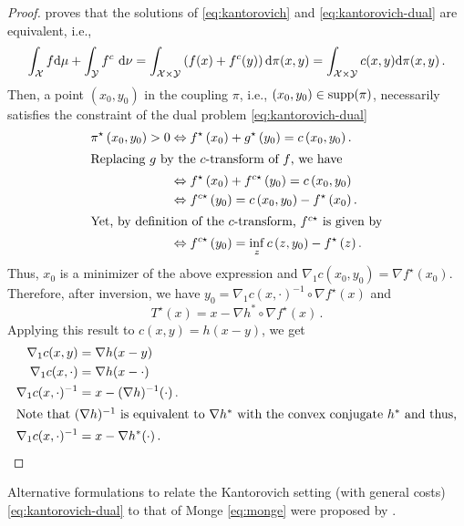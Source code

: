 \begin{proof}
\citet[Theorem 1.39]{santambrogio2015optimal} proves that the solutions of \eqref{eq:kantorovich} and \eqref{eq:kantorovich-dual} are equivalent, i.e.,
\begin{equation*}
	\int_{\mathcal{X}} f \mathrm{d} \mu+\int_{\mathcal{Y}} f^c \mathrm{~d} \nu=\int_{{\mathcal{X}} \times {\mathcal{Y}}}\left(f(x)+f^c(y)\right) \mathrm{d} \pi(x, y)=\int_{{\mathcal{X}} \times {\mathcal{Y}}} c(x, y) \mathrm{d} \pi(x, y)\,.
\end{equation*}
Then, a point $(x_0, y_0)$ in the coupling $\pi$, i.e., $(x_0, y_0) \in \operatorname{supp}(\pi)$, necessarily satisfies the constraint of the dual problem \eqref{eq:kantorovich-dual}
\begin{align*}
\pi^{\star}\left(x_0, y_0\right)>0 & \Leftrightarrow f^{\star}\left(x_0\right)+g^{\star}\left(y_0\right)=c\left(x_0, y_0\right). \\
\intertext{Replacing $g$ by the $c$-transform of $f$, we have}
& \Leftrightarrow f^{\star}\left(x_0\right)+ f^{c\star}\left(y_0\right)=c\left(x_0, y_0\right) \\
& \Leftrightarrow f^{c\star}\left(y_0\right)=c\left(x_0, y_0\right)-f^{\star}\left(x_0\right). \\
\intertext{Yet, by definition of the $c$-transform, $f^{c\star}$ is given by}
& \Leftrightarrow f^{c\star}\left(y_0\right)= \inf_z c\left(z, y_0\right)-f^{\star}\left(z\right).
\end{align*}
Thus, $x_0$ is a minimizer of the above expression and $\nabla_1 c\left(x_0, y_0\right)=\nabla f^{\star}\left(x_0\right)$.  
Therefore, after inversion, we have $y_0=\nabla_1 c(x, \cdot)^{-1} \circ \nabla f^{\star}(x)$ and
\begin{equation*}
		T^{\star}(x)=x-\nabla h^* \circ \nabla f^{\star}(x)\,.
	\end{equation*}
Applying this result to $c(x, y) = h(x-y)$, we get 
\begin{align*}
  \nabla_1 c(x, y) & =\nabla h(x-y) \\
  \nabla_1 c(x, \cdot) & =\nabla h(x-\cdot) \\
  \nabla_1 c(x, \cdot)^{-1} & =x-(\nabla h)^{-1}(\cdot)\,. \\ 
\intertext{Note that $(\nabla h)^{-1}$ is equivalent to $\nabla h^*$ with the convex conjugate $h^*$ and thus,}
  \nabla_1 c(x, \cdot)^{-1} & =x-\nabla h^*(\cdot)\,.	
\end{align*}
\end{proof}
Alternative formulations to relate the Kantorovich setting (with general costs) \eqref{eq:kantorovich-dual} to that of Monge \eqref{eq:monge} were proposed by \citet{ruschendorf1991bounds, ruschendorf1991frechet, caffarelli2017allocation}. \\

